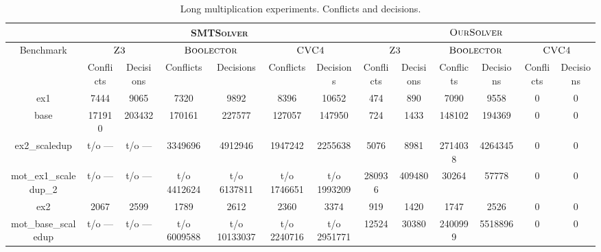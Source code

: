 \begin{table}[t]
\centering
\caption{Long multiplication experiments. Conflicts and decisions.}
\label{my-label}
\begin{tabular}{|c|c|c|c|c|c|c|c|c|c|c|c|c|}
\hline
                      & \multicolumn{6}{c|}{\textsc{SMTSolver}}                                                            & \multicolumn{6}{c|}{$\textsc{OurSolver}$}                                                                      \\ \hline
Benchmark             & \multicolumn{2}{c|}{$\textsc{Z3}$} & \multicolumn{2}{c|}{$\textsc{Boolector}$} & \multicolumn{2}{c|}{$\textsc{CVC4}$} & \multicolumn{2}{c|}{$\textsc{Z3}$} & \multicolumn{2}{c|}{$\textsc{Boolector}$} & \multicolumn{2}{c|}{$\textsc{CVC4}$} \\ \hline
                      & Conflicts      & Decisions     & Conflicts       & Decisions       & Conflicts      & Decisions      & Conflicts      & Decisions     & Conflicts       & Decisions       & Conflicts      & Decisions      \\ \hline
ex1                   & 7444           & 9065          & 7320            & 9892            & 8396           & 10652          & 474            & 890           & 7090            & 9558            & 0              & 0              \\ \hline
base                  & 171910         & 203432        & 170161          & 227577          & 127057         & 147950         & 724            & 1433          & 148102          & 194369          & 0              & 0              \\ \hline
ex2\_scaledup         & t/o ---        & t/o ---       & 3349696         & 4912946         & 1947242        & 2255638        & 5076           & 8981          & 2714038         & 4264345         & 0              & 0              \\ \hline
mot\_ex1\_scaledup\_2 & t/o ---        & t/o ---       & t/o 4412624     & t/o 6137811     & t/o 1746651    & t/o 1993209    & 280936         & 409480        & 30264           & 57778           & 0              & 0              \\ \hline
ex2                   & 2067           & 2599          & 1789            & 2612            & 2360           & 3374           & 919            & 1420          & 1747            & 2526            & 0              & 0              \\ \hline
mot\_base\_scaledup   & t/o ---        & t/o ---       & t/o 6009588     & t/o 10133037    & t/o 2240716    & t/o 2951771    & 12524          & 30380         & 2400999         & 5518896         & 0              & 0              \\ \hline

\end{tabular}
\end{table}
